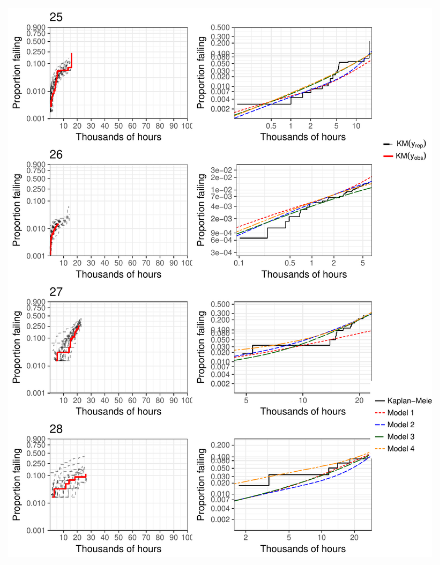 \documentclass[12pt]{article}
\begin{document}
\begin{figure}[H]
\includegraphics[width=\textwidth]{ppcheck-v2-7.pdf}
\end{figure}
\end{document}
